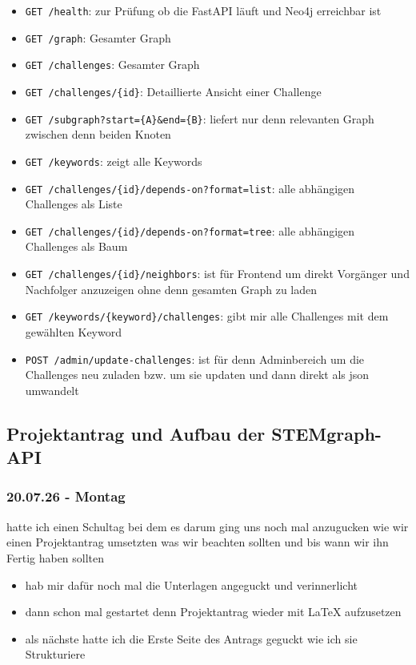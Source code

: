 \begin{itemize}
\item \texttt{GET /health}: zur Prüfung ob die FastAPI läuft und Neo4j erreichbar ist
\item \texttt{GET /graph}: Gesamter Graph
\item \texttt{GET /challenges}: Gesamter Graph
\item \texttt{GET /challenges/\{id\}}: Detaillierte Ansicht einer Challenge
\item \texttt{GET /subgraph?start=\{A\}\&end=\{B\}}: liefert nur denn relevanten Graph zwischen denn beiden Knoten
\item \texttt{GET /keywords}: zeigt alle Keywords

\item \texttt{GET /challenges/\{id\}/depends-on?format=list}: alle abhängigen Challenges als Liste
\item \texttt{GET /challenges/\{id\}/depends-on?format=tree}: alle abhängigen Challenges als Baum
\item \texttt{GET /challenges/\{id\}/neighbors}: ist für Frontend um direkt Vorgänger und Nachfolger anzuzeigen ohne denn gesamten Graph zu laden
\item \texttt{GET /keywords/\{keyword\}/challenges}: gibt mir alle Challenges mit dem gewählten Keyword
\item \texttt{POST /admin/update-challenges}: ist für denn Adminbereich um die Challenges neu zuladen bzw. um sie updaten und dann direkt als json umwandelt
\end{itemize}

\subsection{Projektantrag und Aufbau der STEMgraph-API}
\subsubsection{20.07.26 - Montag}

hatte ich einen Schultag bei dem es darum ging uns noch mal anzugucken wie wir einen Projektantrag umsetzten was wir beachten sollten und bis wann wir ihn Fertig haben sollten

\begin{itemize}
\item hab mir dafür noch mal die Unterlagen angeguckt und verinnerlicht
\item dann schon mal gestartet denn Projektantrag wieder mit LaTeX aufzusetzen
\item als nächste hatte ich die Erste Seite des Antrags geguckt wie ich sie Strukturiere
\end{itemize}

